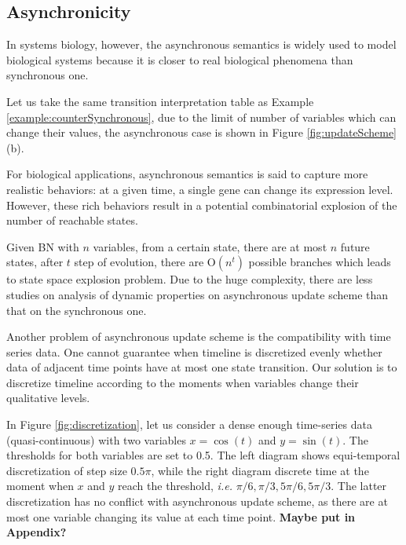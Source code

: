 \subsection{Asynchronicity}
In systems biology, however, the asynchronous semantics is widely used to model biological systems because it is closer to real biological phenomena than synchronous one.

\begin{example}
Let us take the same transition interpretation table as Example \ref{example:counterSynchronous}, due to the limit of number of variables which can change their values, the asynchronous case is shown in Figure \ref{fig:updateScheme} (b).
\end{example}

For biological applications, asynchronous semantics is said to capture more realistic behaviors: at a given time, a single gene can change its expression level.
However, these rich behaviors result in a potential combinatorial explosion of the number of reachable states.

Given BN with $n$ variables, from a certain state, there are at most $n$ future states, after $t$ step of evolution, there are O$(n^t)$ possible branches which leads to state space explosion problem.
Due to the huge complexity, there are less studies on analysis of dynamic properties on asynchronous update scheme than that on the synchronous one.

Another problem of asynchronous update scheme is the compatibility with time series data.
One cannot guarantee when timeline is discretized evenly whether data of adjacent time points have at most one state transition. 
Our solution is to discretize timeline according to the moments when variables change their qualitative levels.

\begin{example}
In Figure \ref{fig:discretization}, let us consider a dense enough time-series data (quasi-continuous) with two variables $x=\cos(t)$ and $y=\sin(t)$.
The thresholds for both variables are set to 0.5.
The left diagram shows equi-temporal discretization of step size $0.5\pi$, while the right diagram discrete time at the moment when $x$ and $y$ reach the threshold, \textit{i.e.} $\pi/6,\pi/3,5\pi/6,5\pi/3$.
The latter discretization has no conflict with asynchronous update scheme, as there are at most one variable changing its value at each time point. \textbf{Maybe put in Appendix?}
\end{example}


